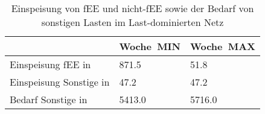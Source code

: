 {
\renewcommand{\arraystretch}{1.2}%
\begin{table}[H]
	\begin{center}
		\caption{Einspeisung von fEE und nicht-fEE sowie der Bedarf von sonstigen Lasten im Last-dominierten Netz}
		\begin{tabu} to 0.7\textwidth {X[2] X[1, r] X[1, r]}
			\toprule
											  & Woche~MIN      & Woche~MAX      \\ \midrule
			Einspeisung fEE in \si{\mwh}      & \num{871.5}  & \num{51.8}   \\
			Einspeisung Sonstige in \si{\mwh} & \num{47.2}   & \num{47.2}   \\
			Bedarf Sonstige  in \si{\mwh}     & \num{5413.0} & \num{5716.0} \\ \bottomrule
		\end{tabu}
		\label{tab:load_dominated_char}
	\end{center}
	\vspace{-3mm}%
\end{table}
}